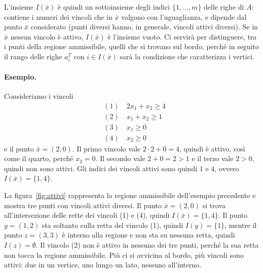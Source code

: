 L'insieme $I(\bar{x})$ è quindi un sottoinsieme degli indici $\{1, \dots, m\}$ delle righe di $A$: contiene i numeri dei vincoli che in $\bar{x}$ valgono con l'uguaglianza, e dipende dal punto $\bar{x}$ considerato (punti diversi hanno, in generale, vincoli attivi diversi). Se in $\bar{x}$ nessun vincolo è attivo, $I(\bar{x})$ è l'insieme vuoto. Ci servirà per distinguere, tra i punti della regione ammissibile, quelli che si trovano sul bordo, perché in seguito il rango delle righe $a_i^T$ con $i \in I(\bar{x})$ sarà la condizione che caratterizza i vertici.

\paragraph{Esempio.}
Consideriamo i vincoli
\[
\begin{aligned}
&(1) \quad 2x_1 + x_2 \ge 4 \\
&(2) \quad x_1 + x_2 \ge 1 \\
&(3) \quad x_1 \ge 0 \\
&(4) \quad x_2 \ge 0
\end{aligned}
\]
e il punto $\bar{x} = (2, 0)$. Il primo vincolo vale $2 \cdot 2 + 0 = 4$, quindi è attivo, così come il quarto, perché $x_2 = 0$. Il secondo vale $2 + 0 = 2 > 1$ e il terzo vale $2 > 0$, quindi non sono attivi. Gli indici dei vincoli attivi sono quindi $1$ e $4$, ovvero $I(\bar{x}) = \{1, 4\}$.

\begin{osservazione}
La figura~\ref{fig:attivi} rappresenta la regione ammissibile dell'esempio precedente e mostra tre punti con vincoli attivi diversi. Il punto $\bar{x} = (2, 0)$ si trova all'intersezione delle rette dei vincoli (1) e (4), quindi $I(\bar{x}) = \{1, 4\}$. Il punto $y = (1, 2)$ sta soltanto sulla retta del vincolo (1), quindi $I(y) = \{1\}$, mentre il punto $z = (3, 3)$ è interno alla regione e non sta su nessuna retta, quindi $I(z) = \emptyset$. Il vincolo (2) non è attivo in nessuno dei tre punti, perché la sua retta non tocca la regione ammissibile. Più ci si avvicina al bordo, più vincoli sono attivi: due in un vertice, uno lungo un lato, nessuno all'interno.
\end{osservazione}

